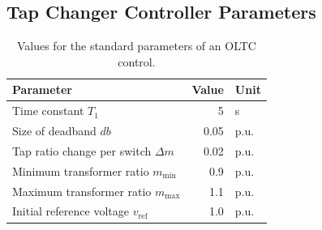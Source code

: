 \subsection{Tap Changer Controller Parameters}
\label{app:voltage-controllers}

\begin{table}[H]
    \caption[Values for the standard parameters of an \acs{OLTC} control]{Values for the standard parameters of an \acs{OLTC} control.}
    \vspace*{12pt}
    \centering
    \small
    \begin{tabularx}{\textwidth}{Xrl}
        \textbf{Parameter} & \textbf{Value} & \textbf{Unit} \\ \hline
        \toprule
        Time constant $T_1$ & 5 & s \\
        Size of deadband $db$ & 0.05 & p.u. \\
        Tap ratio change per switch $\Delta m$ & 0.02 & p.u. \\
        Minimum transformer ratio $m_\mathrm{min}$ & 0.9 & p.u. \\
        Maximum transformer ratio $m_\mathrm{max}$ & 1.1 & p.u. \\
        Initial reference voltage $v_\mathrm{ref}$ & 1.0 & p.u. \\
        \bottomrule
    \end{tabularx}
\end{table}

